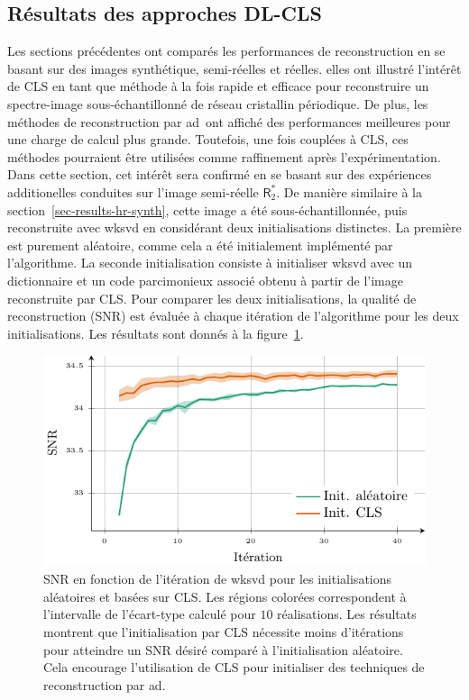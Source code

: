  
\subsection{Résultats des approches DL-CLS}\label{sec-DL-CLS}

Les sections précédentes ont comparés les performances de reconstruction en se basant sur des images synthétique, semi-réelles et réelles. elles ont illustré l'intérêt de CLS en tant que méthode à la fois rapide et efficace pour reconstruire un spectre-image sous-échantillonné de réseau cristallin périodique. De plus, les méthodes de reconstruction par \gls{ad} ont affiché des performances meilleures pour une charge de calcul plus grande. Toutefois, une fois couplées à CLS, ces méthodes pourraient être utilisées comme raffinement après l'expérimentation. 
%
Dans cette section, cet intérêt sera confirmé en se basant sur des expériences additionelles conduites sur l'image semi-réelle $\mathsf{R}_2^*$. De manière similaire à la section~\ref{sec-results-hr-synth}, cette image a été sous-échantillonnée, puis reconstruite avec \gls{wksvd} en considérant deux initialisations distinctes. 
%
La première est purement aléatoire, comme cela a été initialement implémenté par l'algorithme. La seconde initialisation consiste à initialiser \gls{wksvd} avec un dictionnaire et un code parcimonieux associé obtenu à partir de l'image reconstruite par CLS. 
%
Pour comparer les deux initialisations, la qualité de reconstruction (SNR) est évaluée à chaque itération de l'algorithme pour les deux initialisations. Les résultats sont donnés à la figure~\ref{fig-FS_init}. 
%

\begin{figure}[htbp]
   \centering
   \includegraphics{img/chapitre4/figure11/CLS_init.pdf}
   \caption{SNR en fonction de l'itération de \gls{wksvd} pour les initialisations aléatoires et basées sur CLS. Les régions colorées correspondent à l'intervalle de l'écart-type calculé pour $10$ réalisations. Les résultats montrent que l'initialisation par CLS nécessite moins d'itérations pour atteindre un SNR désiré comparé à l'initialisation aléatoire. Cela encourage l'utilisation de CLS pour initialiser des techniques de reconstruction par \gls{ad}.
       \protect\label{fig-FS_init}}
\end{figure}


